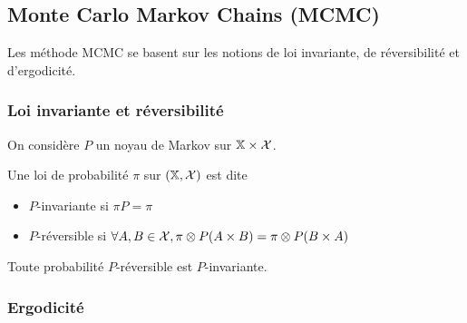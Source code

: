 \documentclass[10pt,a4paper]{article}
\begin{document}
\subsection{Monte Carlo Markov Chains (MCMC)}

Les méthode MCMC se basent sur les notions de loi invariante, de réversibilité et d'ergodicité.

\subsubsection{Loi invariante et réversibilité}

On considère $P$ un noyau de Markov sur $\mathbb{X} \times \mathcal{X}$.
\begin{Def}
	Une loi de probabilité $\pi$ sur $(\mathbb{X}, \mathcal{X})$ est dite
	\begin{itemize}
		\item $P$-invariante si $\pi P = \pi$
		\item $P$-réversible si $\forall A,B \in \mathcal{X}, \pi \otimes P (A \times B) = \pi \otimes P (B \times A)$
	\end{itemize}
\end{Def}

\begin{Prop}
	Toute probabilité $P$-réversible est $P$-invariante.
\end{Prop}

\subsubsection{Ergodicité}

\end{document}
